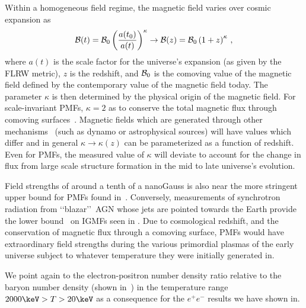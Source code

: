 Within a homogeneous field regime, the magnetic field varies over cosmic expansion as
\begin{align}
    \label{cosmicscale}
    {\cal B}(t)={\cal B}_{0}\left(\frac{a(t_0)}{a(t)}\right)^{\kappa}\rightarrow{\cal B}(z)={\cal B}_{0}\left(1+z\right)^{\kappa}\,,
\end{align}
where $a(t)$ is the scale factor for the universe's expansion (as given by the FLRW metric), $z$ is the redshift, and ${\cal B}_{0}$ is the comoving value of the magnetic field defined by the contemporary value of the magnetic field today. The parameter $\kappa$ is then determined by the physical origin of the magnetic field. For scale-invariant PMFs, $\kappa=2$ as to conserve the total magnetic flux through comoving surfaces~\cite{durrer2013cosmological}. Magnetic fields which are generated through other mechanisms~\cite{pomakov2022redshift} (such as dynamo or astrophysical sources) will have values which differ and in general $\kappa\rightarrow\kappa(z)$ can be parameterized as a function of redshift. Even for PMFs, the measured value of $\kappa$ will deviate to account for the change in flux from large scale structure formation in the mid to late universe's evolution.

Field strengths of around a tenth of a nanoGauss is also near the more stringent upper bound for PMFs found in~\cite{pshirkov2015new,jedamzik2019stringent}. Conversely, measurements of synchrotron radiation from \lq\lq blazar\rq\rq\ AGN whose jets are pointed towards the Earth provide the lower bound~\cite{neronov2010evidence,taylor2011extragalactic} on IGMFs seen in . Due to cosmological redshift, and the conservation of magnetic flux through a comoving surface, PMFs would have extraordinary field strengths during the various primordial plasmas of the early universe subject to whatever temperature they were initially generated in.

{\xblue We point again to the} electron-positron number density ratio relative to the baryon number density (shown in~) in the temperature range $2000\keV>T>20\keV$ as a consequence for the $e^{+}e^{-}$ results we have shown in.

